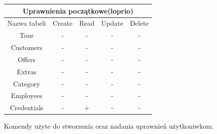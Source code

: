 \documentclass[polish,polish,a4paper]{article}
\begin{document}
\begin{center}
 \begin{tabular}{|c c c c c|} 
  \hline
 \multicolumn{5}{|c|}{Uprawnienia początkowe(loprio)} \\
 \hline
 Nazwa tabeli  & Create & Read & Update & Delete\\ [0.3ex] 
 \hline\hline
 Tour & - & -  & - & -\\ 
 \hline
 Customers  & -  & -  & -  & -  \\
 \hline
 Offers  & - & -  & -  & -\\
 \hline
 Extras  & -  & -  & -  & - \\
 \hline
 Category  & -  & -  & -  & - \\ [1ex] 
 \hline
 Employees  & -  & -  & -  & - \\ [1ex] 
 \hline
 Credentials  & -  & +  & -  & - \\ [1ex] 
 \hline
\end{tabular}
\end{center}
Komendy użyte do stworzenia oraz nadania uprawnień użytkoniwkom.
\end{document}
